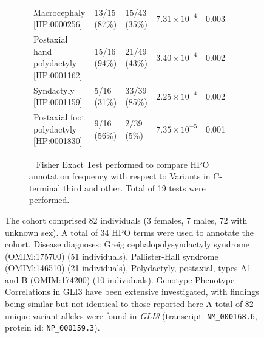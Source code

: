 \begin{figure}[htbp]
\begin{subfigure}[b]{0.95\textwidth}
{\begin{tabular}{llllrr}
\midrule
Macrocephaly [HP:0000256] & 13/15 (87\%) & 15/43 (35\%) & $7.31\times 10^{-4}$ & 0.003\\
Postaxial hand polydactyly [HP:0001162] & 15/16 (94\%) & 21/49 (43\%) & $3.40\times 10^{-4}$ & 0.002\\
Syndactyly [HP:0001159] & 5/16 (31\%) & 33/39 (85\%) & $2.25\times 10^{-4}$ & 0.002\\
Postaxial foot polydactyly [HP:0001830] & 9/16 (56\%) & 2/39 (5\%) & $7.35\times 10^{-5}$ & 0.001\\
\bottomrule
\end{tabular}
}
\captionsetup{justification=raggedright,singlelinecheck=false}
\caption{         Fisher Exact Test performed to compare HPO annotation frequency with respect to Variants in C-terminal third and other. Total of
        19 tests were performed. }
\end{subfigure}
\vspace{0.4em}
\caption{ The cohort comprised 82 individuals (3 females, 7 males, 72 with unknown sex). A total of 34 HPO terms were used to annotate the cohort. Disease diagnoses: Greig cephalopolysyndactyly syndrome (OMIM:175700) (51 individuals), Pallister-Hall syndrome (OMIM:146510) (21 individuals), Polydactyly, postaxial, types A1 and B (OMIM:174200) (10 individuals). Genotype-Phenotype-Correlations in GLI3 have been extensive investigated, with findings being similar 
but not identical to those reported here \cite{PMID_15739154,PMID_22903559,PMID_33058447,PMID_24736735,PMID_9354780,PMID_28224613,PMID_34482537} A total of 82 unique variant alleles were found in \textit{GLI3} (transcript: \texttt{NM\_000168.6}, protein id: \texttt{NP\_000159.3}).}
\end{figure}
